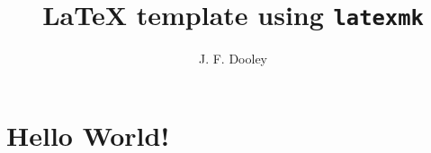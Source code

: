 \documentclass[12pt]{article}
\author{J. F. Dooley}
\title{\LaTeX{} template using \texttt{latexmk}}
\begin{document}
\maketitle

\section{Hello World!}
\lipsum[1-2]~\cite{LaTeX2020,Kerrisk2010}



\end{document}
